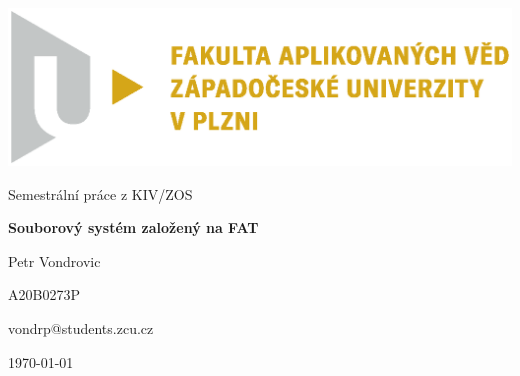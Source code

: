 \documentclass[12pt]{report}
\begin{document}
	\begin{titlepage}
		\vspace*{-2cm}
		{\centering\includegraphics[scale=0.5]{images/FAV_cmyk.eps}\par}
		\centering
		\vspace*{2cm}
		{\Large Semestrální práce z KIV/ZOS\par}
		\vspace{1.5cm}
		{\Huge\bfseries Souborový systém založený na FAT\par}
		\vspace{2cm}
		
		{\Large Petr Vondrovic\par}
		{\Large A20B0273P\par}
		{\Large vondrp@students.zcu.cz\par}
		
		\vfill
		
		{\Large \today}
	\end{titlepage}
	
	
\end{document}

